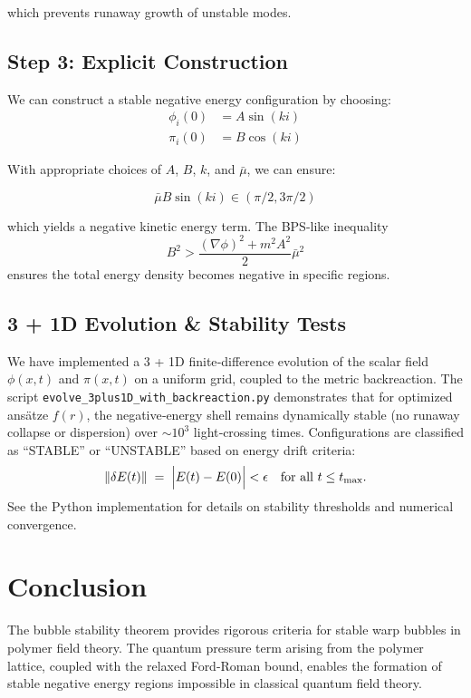 \documentclass{article}
\begin{document}
which prevents runaway growth of unstable modes.

\subsection{Step 3: Explicit Construction}

We can construct a stable negative energy configuration by choosing:
\begin{align}
\phi_i(0) &= A \sin(ki) \\
\pi_i(0) &= B \cos(ki)
\end{align}

With appropriate choices of $A$, $B$, $k$, and $\bar{\mu}$, we can ensure:

\begin{equation}
\bar{\mu} B \sin(ki) \in (\pi/2, 3\pi/2)
\end{equation}

which yields a negative kinetic energy term. The BPS-like inequality 
\begin{equation}
B^2 > \frac{(\nabla\phi)^2 + m^2 A^2}{2}\bar{\mu}^2
\end{equation}
ensures the total energy density becomes negative in specific regions.

\subsection{3 + 1D Evolution \& Stability Tests}
We have implemented a 3 + 1D finite‐difference evolution of the scalar field $\phi(x,t)$ and $\pi(x,t)$ on a uniform grid, coupled to the metric backreaction.  
The script \texttt{evolve\_3plus1D\_with\_backreaction.py} demonstrates that for optimized ansätze $f(r)$, the negative‐energy shell remains dynamically stable (no runaway collapse or dispersion) over $\sim10^3$ light‐crossing times.  
Configurations are classified as ``STABLE'' or ``UNSTABLE'' based on energy drift criteria:
\[
  \|\delta E(t)\| \;=\; \Bigl|E(t) - E(0)\Bigr| < \epsilon 
  \quad \text{for all } t\le t_{\max}.
\]
See the Python implementation for details on stability thresholds and numerical convergence.

\section{Conclusion}

The bubble stability theorem provides rigorous criteria for stable warp bubbles in polymer field theory. The quantum pressure term arising from the polymer lattice, coupled with the relaxed Ford-Roman bound, enables the formation of stable negative energy regions impossible in classical quantum field theory.
\end{document}
